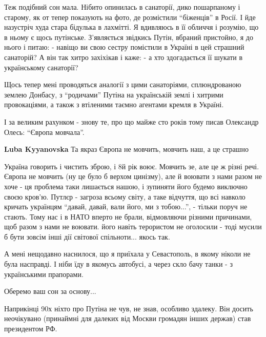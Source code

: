 \begin{itemize}

Теж подібний сон мала. Нібито опинилась в санаторії, дико пошарпаному і
старому, як от тепер показують на фото, де розмістили \enquote{біженців} в Росії. І йде
назустріч худа стара бідулька в лахмітті. Я вдивляюсь в її обличчя і розумію,
що в ньому є щось путінське. З'являється звідкись Путін, вбраний пристойно, я
до нього і питаю: - навіщо ви свою сестру помістили в Україні в цей страшний
санаторій? А він так хитро захіхікав і каже: - а хто здогадається її шукати в
українському санаторії?

Щось тепер мені проводяться аналогії з цими санаторіями, сплюндрованою землею
Донбасу, з \enquote{родичами} Путіна на українській землі і хитрими провокаціями, а
також з втіленими таємно агентами кремля в Україні.


І за великим рахунком - знову те, про що майже сто років тому писав Олександр
Олесь: \enquote{Європа мовчала}.

\begin{itemize} %
\textbf{Luba Kyyanovska} Та якраз Європа не мовчить, мовчить наш, а це страшно


Україна говорить і чистить зброю, і 8й рік воює. Мовчить зе, але це ж різні
речі. Європа не мовчить (ну це було б верхом цинізму), але й воювати з нами
разом не хоче - ця проблема таки лишається нашою, і зупиняти його будемо
виключно своєю кров'ю. Путлєр - загроза всьому світу, а таке відчуття, що всі
навколо кричать українцям \enquote{давай, давай, вали його, ми з тобою...}, - тільки
поруч не стають. Тому нас і в НАТО вперто не брали, відмовляючи різними
причинами, щоб разом з нами не воювати. його навіть терористом не оголосили -
тоді мусили б бути зовсім інші дії світової спільноти... якось так.

\end{itemize} %


А мені нещодавно наснилося, що я приїхала у Севастополь, в якому ніколи не була
насправді. І ніби їду в якомусь автобусі, а через скло бачу танки - з
українськими прапорами.

Оберемо ваш сон за основу...


Наприкінці 90х ніхто про Путіна не чув, не знав, особливо здалеку. Він досить
неочікувано (принаймні для далеких від Москви громадян інших держав) став
президентом РФ.


\end{itemize}
